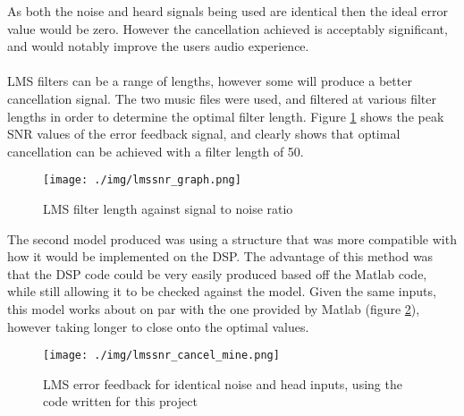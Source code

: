 \noindent As both the noise and heard signals being used are identical then the ideal error value would be zero.
However the cancellation achieved is acceptably significant, and would notably improve the users audio experience.
\\
\\
LMS filters can be a range of lengths, however some will produce a better cancellation signal.
The two music files were used, and filtered at various filter lengths in order to determine the optimal filter length.
Figure \ref{fig:modellmsfiltlen} shows the peak SNR values of the error feedback signal, and clearly shows that optimal cancellation can be achieved with a filter length of 50.

\begin{figure}[H]
	\centering
	\texttt{[image: ./img/lmssnr\_graph.png]}
	\caption{LMS filter length against signal to noise ratio}
	\label{fig:modellmsfiltlen}
\end{figure}

\noindent The second model produced was using a structure that was more compatible with how it would be implemented on the DSP.
The advantage of this method was that the DSP code could be very easily produced based off the Matlab code, while still allowing it to be checked against the model.
Given the same inputs, this model works about on par with the one provided by Matlab (figure \ref{fig:modellmscancelmine}), however taking longer to close onto the optimal values.

\begin{figure}[H]
	\centering
	\texttt{[image: ./img/lmssnr\_cancel\_mine.png]}
	\caption{LMS error feedback for identical noise and head inputs, using the code written for this project}
	\label{fig:modellmscancelmine}
\end{figure}

